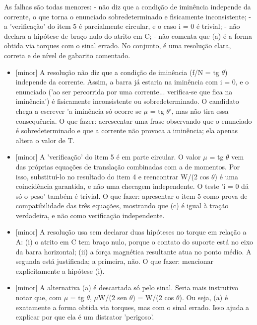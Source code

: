 \documentclass{article}%
\begin{document}
\newline%
As falhas são todas menores:\newline%
{-} não diz que a condição de iminência independe da corrente, o que torna o enunciado sobredeterminado e fisicamente inconsistente;\newline%
{-} a 'verificação' do item 5 é parcialmente circular, e o caso i = 0 é trivial;\newline%
{-} não declara a hipótese de braço nulo do atrito em C;\newline%
{-} não comenta que (a) é a forma obtida via torques com o sinal errado.\newline%
\newline%
No conjunto, é uma resolução clara, correta e de nível de gabarito comentado.%
\begin{itemize}%
\item%
{[}minor{]} A resolução não diz que a condição de iminência (f/N = tg $\theta$) independe da corrente. Assim, a barra já estaria na iminência com i = 0, e o enunciado ('ao ser percorrida por uma corrente... verifica{-}se que fica na iminência') é fisicamente inconsistente ou sobredeterminado. O candidato chega a escrever 'a iminência só ocorre se $\mu$ = tg $\theta$', mas não tira essa consequência. O que fazer: acrescentar uma frase observando que o enunciado é sobredeterminado e que a corrente não provoca a iminência; ela apenas altera o valor de T.%
\item%
{[}minor{]} A 'verificação' do item 5 é em parte circular. O valor $\mu$ = tg $\theta$ vem das próprias equações de translação combinadas com a de momentos. Por isso, substituí{-}lo no resultado do item 4 e reencontrar W/(2 cos $\theta$) é uma coincidência garantida, e não uma checagem independente. O teste 'i = 0 dá só o peso' também é trivial. O que fazer: apresentar o item 5 como prova de compatibilidade das três equações, mostrando que (c) é igual à tração verdadeira, e não como verificação independente.%
\item%
{[}minor{]} A resolução usa sem declarar duas hipóteses no torque em relação a A: (i) o atrito em C tem braço nulo, porque o contato do suporte está no eixo da barra horizontal; (ii) a força magnética resultante atua no ponto médio. A segunda está justificada; a primeira, não. O que fazer: mencionar explicitamente a hipótese (i).%
\item%
{[}minor{]} A alternativa (a) é descartada só pelo sinal. Seria mais instrutivo notar que, com $\mu$ = tg $\theta$, $\mu$W/(2 sen $\theta$) = W/(2 cos $\theta$). Ou seja, (a) é exatamente a forma obtida via torques, mas com o sinal errado. Isso ajuda a explicar por que ela é um distrator 'perigoso'.%
\end{itemize}%
\end{document}
